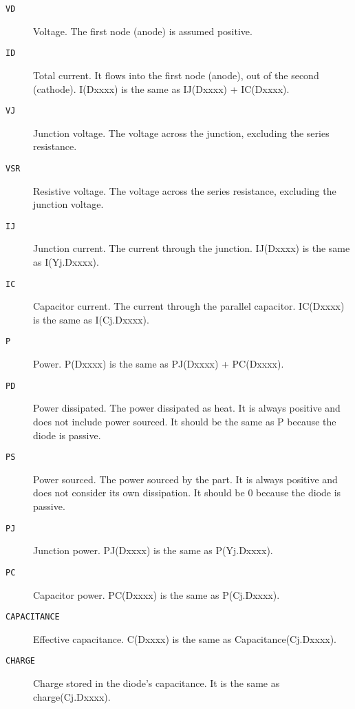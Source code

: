 \begin{description}
  
\item[{\tt VD}] Voltage.  The first node (anode) is assumed positive.
  
\item[{\tt ID}] Total current.  It flows into the first node (anode),
  out of the second (cathode).  I(Dxxxx) is the same as IJ(Dxxxx) +
  IC(Dxxxx).
  
\item[{\tt VJ}] Junction voltage.  The voltage across the junction,
  excluding the series resistance.

\item[{\tt VSR}] Resistive voltage.  The voltage across the series
  resistance, excluding the junction voltage.

\item[{\tt IJ}] Junction current.  The current through the junction.
  IJ(Dxxxx) is the same as I(Yj.Dxxxx).
  
\item[{\tt IC}] Capacitor current.  The current through the parallel
  capacitor.  IC(Dxxxx) is the same as I(Cj.Dxxxx).
  
\item[{\tt P}] Power.  P(Dxxxx) is the same as PJ(Dxxxx) + PC(Dxxxx).
  
\item[{\tt PD}] Power dissipated.  The power dissipated as heat.  It
  is always positive and does not include power sourced.  It should be
  the same as P because the diode is passive.
  
\item[{\tt PS}] Power sourced.  The power sourced by the part.  It is
  always positive and does not consider its own dissipation.  It
  should be 0 because the diode is passive.
  
\item[{\tt PJ}] Junction power.  PJ(Dxxxx) is the same as P(Yj.Dxxxx).
  
\item[{\tt PC}] Capacitor power.  PC(Dxxxx) is the same as
  P(Cj.Dxxxx).
  
\item[{\tt CAPACITANCE}] Effective capacitance.  C(Dxxxx) is the same
  as Capacitance(Cj.Dxxxx).
  
\item[{\tt CHARGE}] Charge stored in the diode's capacitance.
  It is the same as charge(Cj.Dxxxx).


\end{description}
